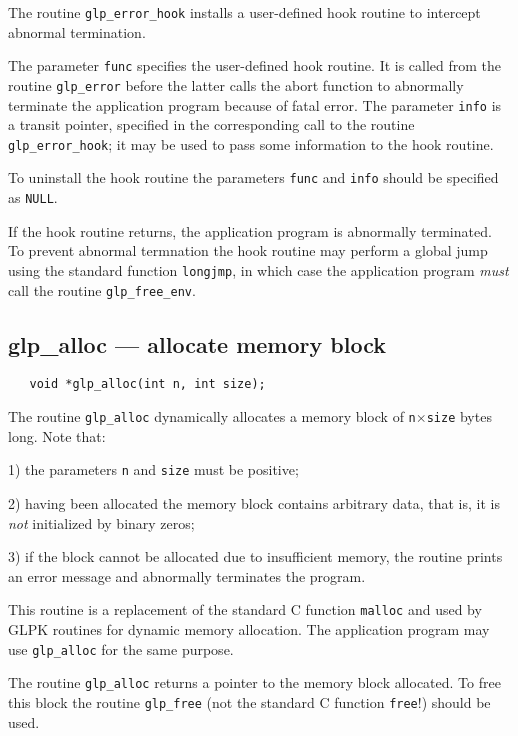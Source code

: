 \description

The routine \verb|glp_error_hook| installs a user-defined hook routine
to intercept abnormal termination.

The parameter \verb|func| specifies the user-defined hook routine. It
is called from the routine \verb|glp_error| before the latter calls the
abort function to abnormally terminate the application program because
of fatal error. The parameter \verb|info| is a transit pointer,
specified in the corresponding call to the routine
\verb|glp_error_hook|; it may be used to pass some information to the
hook routine.

To uninstall the hook routine the parameters \verb|func| and \verb|info|
should be specified as \verb|NULL|.

If the hook routine returns, the application program is abnormally
terminated. To prevent abnormal termnation the hook routine may perform
a global jump using the standard function \verb|longjmp|, in which case
the application program {\it must} call the routine \verb|glp_free_env|.

\subsection{glp\_alloc --- allocate memory block}

\synopsis

\begin{verbatim}
   void *glp_alloc(int n, int size);
\end{verbatim}

\description

The routine \verb|glp_alloc| dynamically allocates a memory block of
\verb|n|$\times$\verb|size| bytes long. Note that:

1) the parameters \verb|n| and \verb|size| must be positive;

2) having been allocated the memory block contains arbitrary data, that
is, it is {\it not} initialized by binary zeros;

3) if the block cannot be allocated due to insufficient memory, the
routine prints an error message and abnormally terminates the program.

This routine is a replacement of the standard C function \verb|malloc|
and used by GLPK routines for dynamic memory allocation. The
application program may use \verb|glp_alloc| for the same purpose.

\returns

The routine \verb|glp_alloc| returns a pointer to the memory block
allocated. To free this block the routine \verb|glp_free| (not the
standard C function \verb|free|!) should be used.

